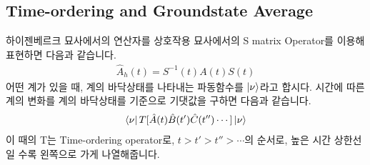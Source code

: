 \documentclass{article}
\begin{document}
\subsection*{Time-ordering and Groundstate Average}
하이젠베르크 묘사에서의 연산자를 상호작용 묘사에서의 S matrix Operator를 이용해 표현하면 다음과 같습니다.
\begin{align}
   \hat{A}_h(t)=S^{-1}(t)A(t)S(t)
\end{align}
어떤 계가 있을 때, 계의 바닥상태를 나타내는 파동함수를 $\ket{\nu}$라고 합시다. 시간에 따른 계의 변화를 계의 바닥상태를 기준으로 기댓값을 구하면 다음과 같습니다.
\begin{align}
   \bra{\nu}T[\hat{A}(t)\hat{B}(t')\hat{C}(t'')\cdots]\ket{\nu}
\end{align}
이 때의 T는 Time-ordering operator로, $t>t'>t''>\cdots$의 순서로, 높은 시간 상한선일 수록 왼쪽으로 가게 나열해줍니다.
\end{document}
